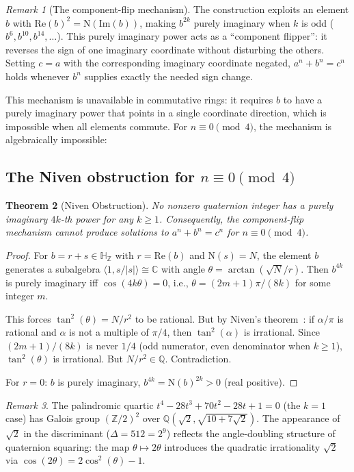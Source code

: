 \documentclass[11pt]{amsart}
\theoremstyle{plain}
\newtheorem{theorem}{Theorem}[section]
\theoremstyle{definition}
\theoremstyle{remark}
\newtheorem{remark}[theorem]{Remark}
\newcommand{\Z}{\mathbb{Z}}
\newcommand{\Q}{\mathbb{Q}}
\newcommand{\C}{\mathbb{C}}
\newcommand{\HH}{\mathbb{H}}
\newcommand{\Norm}[1]{\mathrm{N}(#1)}
\begin{document}
\begin{remark}[The component-flip mechanism]
The construction exploits an element $b$ with $\mathrm{Re}(b)^2 = \Norm{\mathrm{Im}(b)}$,
making $b^{2k}$ purely imaginary when $k$ is odd ($b^6, b^{10}, b^{14}, \ldots$).
This purely imaginary power acts as a ``component flipper'': it reverses the sign
of one imaginary coordinate without disturbing the others.
Setting $c = a$ with the corresponding imaginary coordinate negated,
$a^n + b^n = c^n$ holds whenever $b^n$ supplies exactly the needed sign change.

This mechanism is unavailable in commutative rings: it requires $b$ to have
a purely imaginary power that points in a single coordinate direction,
which is impossible when all elements commute.
For $n \equiv 0 \pmod{4}$, the mechanism is algebraically impossible:
\end{remark}

\subsection{The Niven obstruction for $n \equiv 0 \pmod{4}$}

\begin{theorem}[Niven Obstruction]\label{thm:niven}
No nonzero quaternion integer has a purely imaginary $4k$-th power for any $k \geq 1$.
Consequently, the component-flip mechanism cannot produce solutions to
$a^n + b^n = c^n$ for $n \equiv 0 \pmod{4}$.
\end{theorem}

\begin{proof}
For $b = r + s \in \HH_\Z$ with $r = \mathrm{Re}(b)$ and $\Norm{s} = N$,
the element $b$ generates a subalgebra $\langle 1, s/|s| \rangle \cong \C$
with angle $\theta = \arctan(\sqrt{N}/r)$.
Then $b^{4k}$ is purely imaginary iff $\cos(4k\theta) = 0$, i.e.,
$\theta = (2m+1)\pi/(8k)$ for some integer $m$.

This forces $\tan^2(\theta) = N/r^2$ to be rational. But by Niven's
theorem~\cite{Niven1956}: if $\alpha/\pi$ is rational and $\alpha$ is not
a multiple of $\pi/4$, then $\tan^2(\alpha)$ is irrational.
Since $(2m+1)/(8k)$ is never $1/4$ (odd numerator, even denominator when $k \geq 1$),
$\tan^2(\theta)$ is irrational. But $N/r^2 \in \Q$. Contradiction.

For $r = 0$: $b$ is purely imaginary, $b^{4k} = \Norm{b}^{2k} > 0$ (real positive).
\end{proof}

\begin{remark}
The palindromic quartic $t^4 - 28t^3 + 70t^2 - 28t + 1 = 0$ (the $k=1$ case)
has Galois group $(\Z/2)^2$ over $\Q(\sqrt{2}, \sqrt{10 + 7\sqrt{2}})$.
The appearance of $\sqrt{2}$ in the discriminant ($\Delta = 512 = 2^9$)
reflects the angle-doubling structure of quaternion squaring: the map
$\theta \mapsto 2\theta$ introduces the quadratic irrationality
$\sqrt{2}$ via $\cos(2\theta) = 2\cos^2(\theta) - 1$.
\end{remark}
\end{document}
